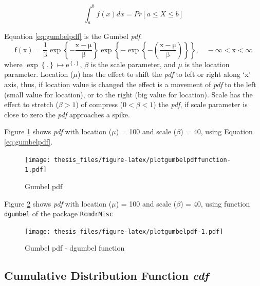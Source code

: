 \documentclass[12pt,oneside]{reedthesis}
\begin{document}
\[
\int_a^b f(x)dx = Pr[a \leq X \leq b]
\]

Equation \eqref{eq:gumbelpdf} is the Gumbel \emph{pdf}.
\begin{equation}
  \mathrm{
          f(x)=\frac{1}{\beta}
          \exp\left\{
            -\frac{x-\mu}{\beta}
          \right\}
          \exp\left\{
            -\exp\left\{
              -\left(
                \frac{x-\mu}{\beta}
              \right)
            \right\}
          \right\},
          \quad -\infty < x < \infty
         }
  \label{eq:gumbelpdf}
\end{equation}
where \(\exp\left\{.\right\} \mapsto \mathrm{e}^{\left\{.\right\}}\), \(\beta\) is the scale parameter, and \(\mu\) is the location parameter. Location (\(\mu\)) has the effect to shift the \emph{pdf} to left or right along `x' axis, thus, if location value is changed the effect is a movement of \emph{pdf} to the left (small value for location), or to the right (big value for location). Scale has the effect to stretch (\(\beta > 1\)) of compress (\(0 < \beta< 1\)) the \emph{pdf}, if scale parameter is close to zero the \emph{pdf} approaches a spike.

Figure \ref{fig:plotgumbelpdffunction} shows \emph{pdf} with location (\(\mu\)) = 100 and scale (\(\beta\)) = 40, using Equation \eqref{eq:gumbelpdf}.

\footnotesize
\begin{figure}
\centering
\texttt{[image: thesis\_files/figure-latex/plotgumbelpdffunction-1.pdf]}
\caption{\label{fig:plotgumbelpdffunction}Gumbel pdf}
\end{figure}
\normalsize

Figure \ref{fig:plotgumbelpdf} shows \emph{pdf} with location (\(\mu\)) = 100 and scale (\(\beta\)) = 40, using function \texttt{dgumbel} of the package \texttt{RcmdrMisc}

\footnotesize
\begin{figure}
\centering
\texttt{[image: thesis\_files/figure-latex/plotgumbelpdf-1.pdf]}
\caption{\label{fig:plotgumbelpdf}Gumbel pdf - dgumbel function}
\end{figure}
\normalsize

\hypertarget{cumulative-distribution-function-cdf}{%
\subsection{\texorpdfstring{Cumulative Distribution Function \emph{cdf}}{Cumulative Distribution Function cdf}}\label{cumulative-distribution-function-cdf}}
\end{document}
